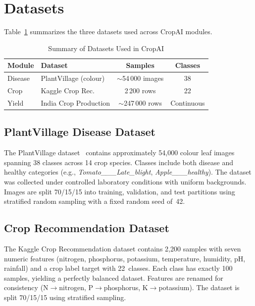 \documentclass[conference]{IEEEtran}
\begin{document}
\section{Datasets}
\label{sec:datasets}

Table~\ref{tab:datasets} summarizes the three datasets used across CropAI modules.

\begin{table}[htbp]
  \centering
  \caption{Summary of Datasets Used in CropAI}
  \label{tab:datasets}
  \begin{tabularx}{\columnwidth}{lXcc}
    \toprule
    \textbf{Module} & \textbf{Dataset} & \textbf{Samples} & \textbf{Classes} \\
    \midrule
    Disease & PlantVillage (colour) & ${\sim}$54\,000 images & 38 \\
    Crop    & Kaggle Crop Rec.      & 2\,200 rows         & 22 \\
    Yield   & India Crop Production & ${\sim}$247\,000 rows & Continuous \\
    \bottomrule
  \end{tabularx}
\end{table}

\subsection{PlantVillage Disease Dataset}
The PlantVillage dataset~\cite{hughes2015open} contains approximately 54,000 colour leaf images spanning 38 classes across 14 crop species. Classes include both disease and healthy categories (e.g., \textit{Tomato\_\_\_Late\_blight}, \textit{Apple\_\_\_healthy}). The dataset was collected under controlled laboratory conditions with uniform backgrounds. Images are split 70/15/15 into training, validation, and test partitions using stratified random sampling with a fixed random seed of~42.

\subsection{Crop Recommendation Dataset}
The Kaggle Crop Recommendation dataset contains 2,200 samples with seven numeric features (nitrogen, phosphorus, potassium, temperature, humidity, pH, rainfall) and a crop label target with 22~classes. Each class has exactly 100 samples, yielding a perfectly balanced dataset. Features are renamed for consistency (N$\to$nitrogen, P$\to$phosphorus, K$\to$potassium). The dataset is split 70/15/15 using stratified sampling.
\end{document}
